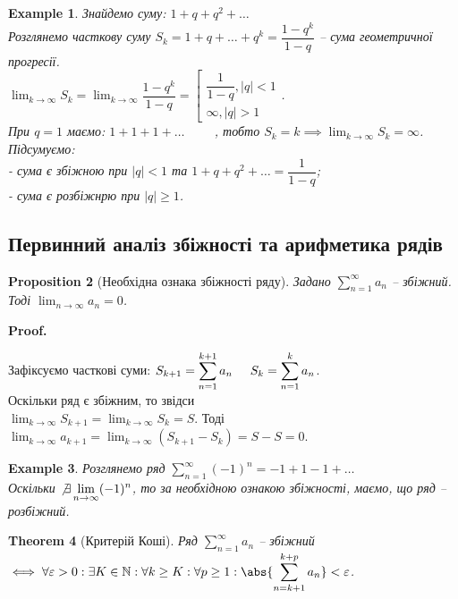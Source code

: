 \documentclass[a4paper, 10pt]{article}
\makeatletter
\def\huge{\displaystyle}
\def\qed{$\blacksquare$}
\theoremstyle{theoremdd}
\newtheorem{theorem}{Theorem}[subsection]
\theoremstyle{theoremdd}
\theoremstyle{theoremdd}
\theoremstyle{theoremdd}
\theoremstyle{theoremdd}
\newtheorem{example}[theorem]{Example}
\theoremstyle{theoremdd}
\newtheorem{proposition}[theorem]{Proposition}
\theoremstyle{theoremdd}
\theoremstyle{theoremdd}
\theoremstyle{theoremdd}
\renewenvironment{proof}[1][Proof.\\]{\par
\pushQED{\hfill \qed}%
\normalfont \topsep6\p@\@plus6\p@\relax
\trivlist
\item\relax
{\bfseries
#1\@addpunct{.}}\hspace\labelsep\ignorespaces
}{%
\popQED\endtrivlist\@endpefalse
}
\makeatother
\begin{document}
\begin{example}
Знайдемо суму: $1 + q + q^2 + \dots$\\
Розглянемо часткову суму $S_k = 1 + q + \dots + q^k = \dfrac{1 - q^k}{1 - q}$ -- сума геометричної прогресії.\\
$\huge \lim_{k \to \infty} S_k = \lim_{k \to \infty} \dfrac{1-q^k}{1 - q} = \left[ \begin{gathered} \dfrac{1}{1-q}, |q|<1 \\ \infty, |q|>1 \end{gathered} \right.$.
\\
При $q = 1$ маємо: $1 + 1 + 1 + \dots \hspace{1cm}$, тобто $S_k = k \implies \huge \lim_{k \to \infty} S_k = \infty$.\\
Підсумуємо:\\
- сума є збіжною при $|q| < 1$ та $1 + q + q^2 + \dots = \dfrac{1}{1-q}$;\\
- сума є розбіжнрю при $|q| \geq 1$.
\end{example}

\subsection{Первинний аналіз збіжності та арифметика рядів}
\begin{proposition}[Необхідна ознака збіжності ряду]
Задано $\huge \sum_{n=1}^{\infty} a_n$ -- збіжний. Тоді $\huge \lim_{n \to \infty} a_n = 0$.
\end{proposition}

\begin{proof}
Зафіксуємо часткові суми: $\huge S_{k+1} = \sum_{n=1}^{k+1} a_n \hspace{0.5cm} S_{k} = \sum_{n=1}^{k} a_n$.\\
Оскільки ряд є збіжним, то звідси \\ $\huge \lim_{k \to \infty} S_{k+1} = \lim_{k \to \infty} S_k = S$. Тоді $\huge \lim_{k \to \infty} a_{k+1} = \lim_{k \to \infty} (S_{k+1} - S_k) = S - S = 0$.
\end{proof}

\begin{example}
Розглянемо ряд $\huge \sum_{n=1}^{\infty} (-1)^n = -1 + 1 - 1 + \dots$\\
Оскільки $\not\exists \huge \lim_{n \to \infty} (-1)^n$, то за необхідною ознакою збіжності, маємо, що ряд -- розбіжний.
\end{example}

\begin{theorem}[Критерій Коші]
Ряд $\huge \sum_{n=1}^{\infty} a_n$ -- збіжний $\iff \forall \varepsilon > 0: \exists K \in \mathbb{N}: \forall k \geq K: \forall p \geq 1: \abs{\huge \sum_{n=k+1}^{k+p} a_n} < \varepsilon$.
\end{theorem}
\end{document}
